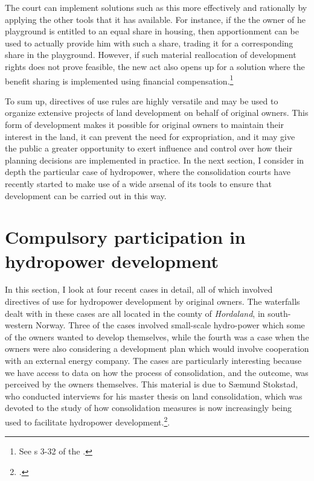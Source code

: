 {The court can implement solutions such as this more effectively and rationally by applying the other tools that it has available. For instance, if the the owner of he playground is entitled to an equal share in housing, then apportionment can be used to actually provide him with such a share, trading it for a corresponding share in the playground. However, if such material reallocation of development rights does not prove feasible, the new act also opens up for a solution where the benefit sharing is implemented using financial compensation.\footnote{See s 3-32 of the \cite{lca13}.}
}

To sum up, directives of use rules are highly versatile and may be used to organize extensive projects of land development on behalf of original owners. This form of development makes it possible for original owners to maintain their interest in the land, it can prevent the need for expropriation, and it may give the public a greater opportunity to exert influence and control over how their planning decisions are implemented in practice. In the next section, I consider in depth the particular case of hydropower, where the consolidation courts have recently started to make use of a wide arsenal of its tools to ensure that development can be carried out in this way.

\section{Compulsory participation in hydropower development}\label{sec:lch}

In this section, I look at four recent cases in detail, all of which involved directives of use for hydropower development by original owners. The waterfalls dealt with in these cases are all located in the county of \emph{Hordaland}, in south-western Norway. Three of the cases involved small-scale hydro-power which some of the owners wanted to develop themselves, while the fourth was a case when the owners were also considering a development plan which would involve cooperation with an external energy company. The cases are particularly interesting because we have access to data on how the process of consolidation, and the outcome, was perceived by the owners themselves. This material is due to Sæmund Stokstad, who conducted interviews for his master thesis on land consolidation, which was devoted to the study of how consolidation measures is now increasingly being used to facilitate hydropower development.\footcite{stokstad11}.


